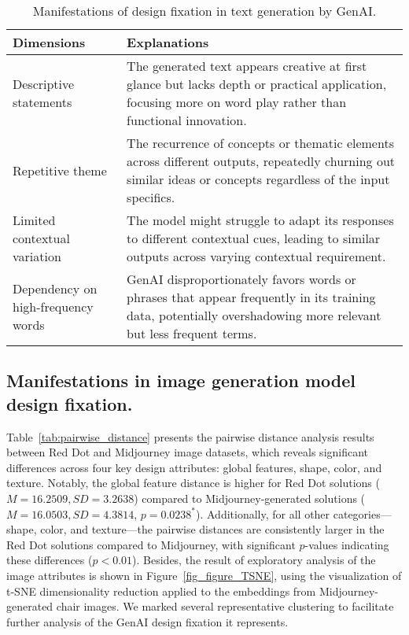 \begin{table}[ht]
\centering
\caption{Manifestations of design fixation in text generation by GenAI.}
\label{tab:manifestations_text}
\begin{tabular}
{p{}p{}} 
\toprule
\textbf{Dimensions} & \textbf{Explanations}\\ 
\midrule
\midrule
Descriptive statements & The generated text appears creative at first glance but lacks depth or practical application, focusing more on word play rather than functional innovation.\\
\midrule
Repetitive theme & The recurrence of concepts or thematic elements across different outputs, repeatedly churning out similar ideas or concepts regardless of the input specifics.\\
\midrule
Limited contextual variation & The model might struggle to adapt its responses to different contextual cues, leading to similar outputs across varying contextual requirement.\\
\midrule
Dependency on high-frequency words & GenAI disproportionately favors words or phrases that appear frequently in its training data, potentially overshadowing more relevant but less frequent terms.\\
\bottomrule
\end{tabular}
\end{table}


\subsection{Manifestations in image generation model design fixation.}
Table~\ref{tab:pairwise_distance} presents the pairwise distance analysis results between Red Dot and Midjourney image datasets, which reveals significant differences across four key design attributes: global features, shape, color, and texture. Notably, the global feature distance is higher for Red Dot solutions (\(M = 16.2509, SD = 3.2638\)) compared to Midjourney-generated solutions (\(M = 16.0503, SD = 4.3814\), \(p = 0.0238^*\)). Additionally, for all other categories—shape, color, and texture—the pairwise distances are consistently larger in the Red Dot solutions compared to Midjourney, with significant \(p\)-values indicating these differences (\(p < 0.01\)). Besides, the result of exploratory analysis of the image attributes is shown in Figure~\ref{fig_figure_TSNE}, using the visualization of t-SNE dimensionality reduction applied to the embeddings from Midjourney-generated chair images. We marked several representative clustering to facilitate further analysis of the GenAI design fixation it represents.

